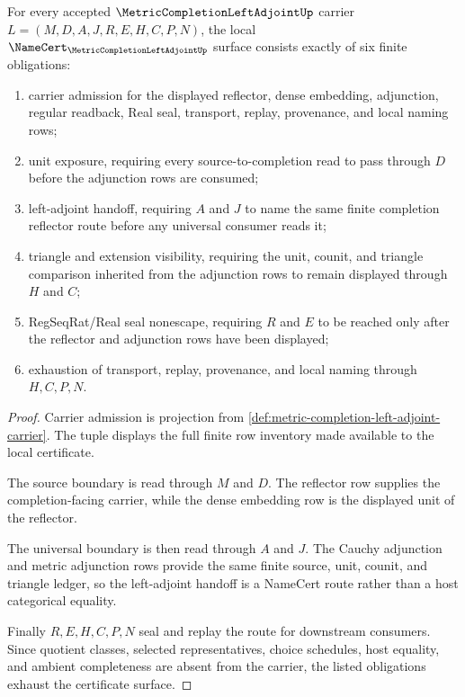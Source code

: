 \begin{theorem}
\label{thm:metric-completion-left-adjoint-namecert-obligations}
For every accepted $\MetricCompletionLeftAdjointUp$ carrier $L=(M,D,A,J,R,E,H,C,P,N)$, the local $\NameCert_{\MetricCompletionLeftAdjointUp}$ surface consists exactly of six finite obligations:
\begin{enumerate}
\item carrier admission for the displayed reflector, dense embedding, adjunction, regular readback, Real seal, transport, replay, provenance, and local naming rows;
\item unit exposure, requiring every source-to-completion read to pass through $D$ before the adjunction rows are consumed;
\item left-adjoint handoff, requiring $A$ and $J$ to name the same finite completion reflector route before any universal consumer reads it;
\item triangle and extension visibility, requiring the unit, counit, and triangle comparison inherited from the adjunction rows to remain displayed through $H$ and $C$;
\item RegSeqRat/Real seal nonescape, requiring $R$ and $E$ to be reached only after the reflector and adjunction rows have been displayed;
\item exhaustion of transport, replay, provenance, and local naming through $H,C,P,N$.
\end{enumerate}
\end{theorem}
\begin{proof}
Carrier admission is projection from \autoref{def:metric-completion-left-adjoint-carrier}. The tuple displays the full finite row inventory made available to the local certificate.

The source boundary is read through $M$ and $D$. The reflector row supplies the completion-facing carrier, while the dense embedding row is the displayed unit of the reflector.

The universal boundary is then read through $A$ and $J$. The Cauchy adjunction and metric adjunction rows provide the same finite source, unit, counit, and triangle ledger, so the left-adjoint handoff is a NameCert route rather than a host categorical equality.

Finally $R,E,H,C,P,N$ seal and replay the route for downstream consumers. Since quotient classes, selected representatives, choice schedules, host equality, and ambient completeness are absent from the carrier, the listed obligations exhaust the certificate surface.
\end{proof}

